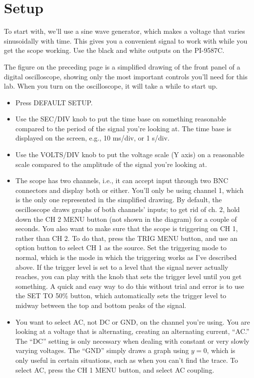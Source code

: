 \section*{Setup}


To start with, we'll use a sine wave generator, which makes
a voltage that varies sinusoidally with time. This gives you
a convenient signal to work with while you get the scope working.
Use the black and white outputs on the PI-9587C.

The figure on the preceding page is a simplified
drawing of the front panel of a digital oscilloscope, showing
only the most important controls you'll need for this lab.
When you turn on the oscilloscope, it will take a while to start
up.


\begin{itemize}
\item[] Press DEFAULT SETUP.

\item[] Use the SEC/DIV knob to
put the time base on something reasonable compared to the
period of the signal you're looking at. The time base is
displayed on the screen, e.g., 10 ms/div, or 1 s/div.

\item[] Use the VOLTS/DIV knob to
put the voltage scale (Y axis) on a reasonable scale
compared to the amplitude of the signal you're looking at.

\item[] The scope has two channels, i.e., it can accept input
through two BNC connectors and display both or either. You'll
only be using channel 1, which is the only one represented in
the simplified drawing. By default, the oscilloscope draws
graphs of both channels' inputs; to get rid of ch. 2, hold
down the CH 2 MENU button (not shown in the diagram) for a couple
of seconds. You also want to make sure that the scope is triggering
on CH 1, rather than CH 2. To do that, press the TRIG MENU
button, and use an option button to select CH 1 as the source.
Set the triggering mode to normal, which is the mode in which
the triggering works as I've described above.
If the trigger level is set to a level that the signal never
actually reaches, you can play with the knob that sets the trigger
level until you get something. A quick and easy way to do this
without trial and error is to use the SET TO 50\%
button, which
automatically sets the trigger level to midway between the top
and bottom peaks of the signal.

\item[] You want to select AC, not DC or GND, on the channel you're using. You
are looking at a voltage that is alternating, creating an
alternating current, ``AC.'' The ``DC'' setting is only
necessary when dealing with constant or very slowly varying
voltages. The ``GND'' simply draws a graph using $y=0$,
which is only useful in certain situations, such as when you
can't find the trace. To select AC, press the CH 1 MENU
button, and select AC coupling.

\end{itemize}

